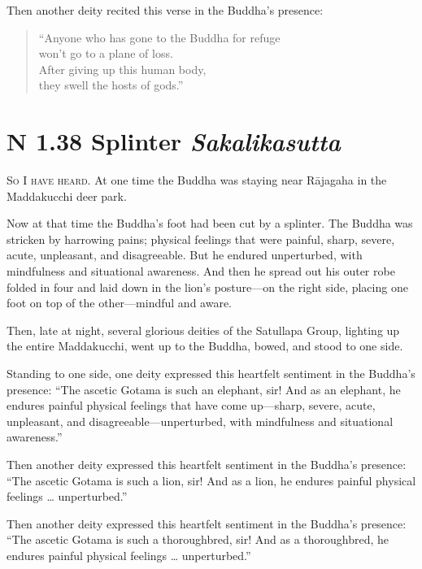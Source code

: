 \documentclass[12pt,openany]{book}%
\newcommand*{\suttatitleacronym}[1]{\smaller[2]{#1}\vspace*{.3em}}
\newcommand*{\suttatitletranslation}[1]{\linebreak{#1}}
\newcommand*{\suttatitleroot}[1]{\linebreak\smaller[2]\itshape{#1}}
\newcommand*{\tocacronym}[1]{\hspace*{-3.3em}{#1}\quad}
\newcommand*{\toctranslation}[1]{#1}
\newcommand*{\tocroot}[1]{(\textit{#1})}
\newcommand*{\scevam}[1]{\textsc{#1}}
\begin{document}
Then another deity recited this verse in the Buddha’s presence: 

\begin{verse}%
“Anyone who has gone to the Buddha for refuge \\
won’t go to a plane of loss. \\
After giving up this human body, \\
they swell the hosts of gods.” 

%
\end{verse}

%
\section*{{\suttatitleacronym SN 1.38}{\suttatitletranslation A Splinter }{\suttatitleroot Sakalikasutta}}
\addcontentsline{toc}{section}{\tocacronym{SN 1.38} \toctranslation{A Splinter } \tocroot{Sakalikasutta}}

\scevam{So I have heard. }At one time the Buddha was staying near \textsanskrit{Rājagaha} in the Maddakucchi deer park. 

Now at that time the Buddha’s foot had been cut by a splinter. The Buddha was stricken by harrowing pains; physical feelings that were painful, sharp, severe, acute, unpleasant, and disagreeable. But he endured unperturbed, with mindfulness and situational awareness. And then he spread out his outer robe folded in four and laid down in the lion’s posture—on the right side, placing one foot on top of the other—mindful and aware. 

Then, late at night, several glorious deities of the Satullapa Group, lighting up the entire Maddakucchi, went up to the Buddha, bowed, and stood to one side. 

Standing to one side, one deity expressed this heartfelt sentiment in the Buddha’s presence: “The ascetic Gotama is such an elephant, sir! And as an elephant, he endures painful physical feelings that have come up—sharp, severe, acute, unpleasant, and disagreeable—unperturbed, with mindfulness and situational awareness.” 

Then another deity expressed this heartfelt sentiment in the Buddha’s presence: “The ascetic Gotama is such a lion, sir! And as a lion, he endures painful physical feelings … unperturbed.” 

Then another deity expressed this heartfelt sentiment in the Buddha’s presence: “The ascetic Gotama is such a thoroughbred, sir! And as a thoroughbred, he endures painful physical feelings … unperturbed.” 
\end{document}
